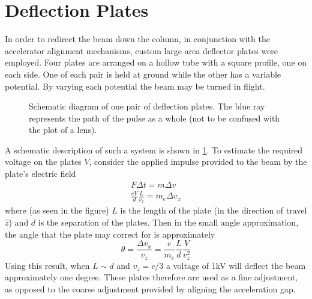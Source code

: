 \section{Deflection Plates}

In order to redirect the beam down the column, in conjunction with the accelerator alignment mechanisms, custom large area deflector plates were employed.
Four plates are arranged on a hollow tube with a square profile, one on each side.
One of each pair is held at ground while the other has a variable potential.
By varying each potential the beam may be turned in flight.

\begin{figure}
  \centering
  
  \caption[Schematic diagram of one pair of deflection plates]{
    Schematic diagram of one pair of deflection plates.
    The blue ray represents the path of the pulse as a whole (not to be confused with the plot of a lens).
  }
  \label{fig:deflector_schematic}
\end{figure}

A schematic description of such a system is shown in \ref{fig:deflector_schematic}.
To estimate the required voltage on the plates $V$, consider the applied impulse provided to the beam by the plate's electric field
\begin{gather}
  F \Delta t = m \Delta v \\
  \frac{ e V }{ d } \frac{ L }{ v_z } = m_e \Delta v_x
\end{gather}
where (as seen in the figure) $L$ is the length of the plate (in the direction of travel $\hat{z}$) and $d$ is the separation of the plates.
Then in the small angle approximation, the angle that the plate may correct for is approximately
\begin{equation}
  \theta = \frac{ \Delta v_x }{ v_z } = \frac{ e }{ m_e } \frac{ L }{ d } \frac{ V }{ v_z^2 }
\end{equation}
Using this result, when $L \sim d$ and $v_z = c/3$ a voltage of 1kV will deflect the beam approximately one degree.
These plates therefore are used as a fine adjustment, as opposed to the coarse adjustment provided by aligning the acceleration gap.

